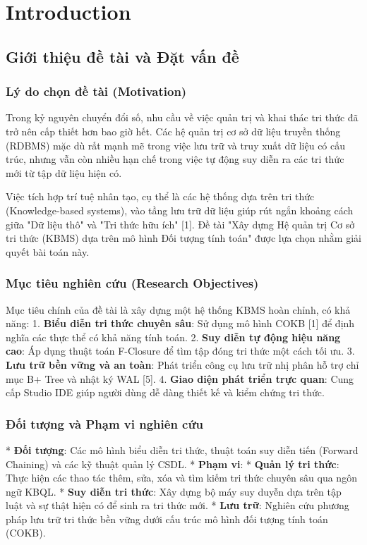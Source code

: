 \chapter{Introduction}
\section{Giới thiệu đề tài và Đặt vấn đề}

\subsection{Lý do chọn đề tài (Motivation)}

Trong kỷ nguyên chuyển đổi số, nhu cầu về việc quản trị và khai thác tri thức đã trở nên cấp thiết hơn bao giờ hết. Các hệ quản trị cơ sở dữ liệu truyền thống (RDBMS) mặc dù rất mạnh mẽ trong việc lưu trữ và truy xuất dữ liệu có cấu trúc, nhưng vẫn còn nhiều hạn chế trong việc tự động suy diễn ra các tri thức mới từ tập dữ liệu hiện có. 

Việc tích hợp trí tuệ nhân tạo, cụ thể là các hệ thống dựa trên tri thức (Knowledge-based systems), vào tầng lưu trữ dữ liệu giúp rút ngắn khoảng cách giữa "Dữ liệu thô" và "Tri thức hữu ích" [1]. Đề tài "Xây dựng Hệ quản trị Cơ sở tri thức (KBMS) dựa trên mô hình Đối tượng tính toán" được lựa chọn nhằm giải quyết bài toán này.

\subsection{Mục tiêu nghiên cứu (Research Objectives)}

Mục tiêu chính của đề tài là xây dựng một hệ thống KBMS hoàn chỉnh, có khả năng:
1.  \textbf{Biểu diễn tri thức chuyên sâu}: Sử dụng mô hình COKB [1] để định nghĩa các thực thể có khả năng tính toán.
2.  \textbf{Suy diễn tự động hiệu năng cao}: Áp dụng thuật toán F-Closure để tìm tập đóng tri thức một cách tối ưu.
3.  \textbf{Lưu trữ bền vững và an toàn}: Phát triển công cụ lưu trữ nhị phân hỗ trợ chỉ mục B+ Tree và nhật ký WAL [5].
4.  \textbf{Giao diện phát triển trực quan}: Cung cấp Studio IDE giúp người dùng dễ dàng thiết kế và kiểm chứng tri thức.

\subsection{Đối tượng và Phạm vi nghiên cứu}

*   \textbf{Đối tượng}: Các mô hình biểu diễn tri thức, thuật toán suy diễn tiến (Forward Chaining) và các kỹ thuật quản lý CSDL.
*   \textbf{Phạm vi}: 
    *   \textbf{Quản lý tri thức}: Thực hiện các thao tác thêm, sửa, xóa và tìm kiếm tri thức chuyên sâu qua ngôn ngữ KBQL.
    *   \textbf{Suy diễn tri thức}: Xây dựng bộ máy suy duyễn dựa trên tập luật và sự thật hiện có để sinh ra tri thức mới.
    *   \textbf{Lưu trữ}: Nghiên cứu phương pháp lưu trữ tri thức bền vững dưới cấu trúc mô hình đối tượng tính toán (COKB).

